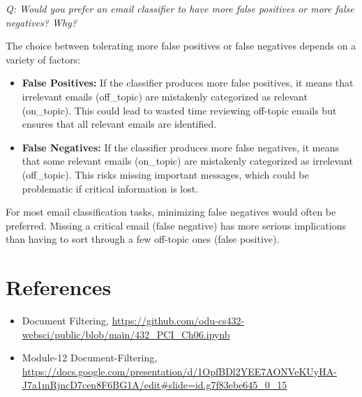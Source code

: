 \documentclass[12pt]{article}
\begin{document}
\emph{Q: Would you prefer an email classifier to have more false positives or more false negatives? Why?}

The choice between tolerating more false positives or false negatives depends on a variety of factors:
\begin{itemize}
    \item \textbf{False Positives:} If the classifier produces more false positives, it means that irrelevant emails (off\_topic) are mistakenly categorized as relevant (on\_topic). This could lead to wasted time reviewing off-topic emails but ensures that all relevant emails are identified.
    \item \textbf{False Negatives:} If the classifier produces more false negatives, it means that some relevant emails (on\_topic) are mistakenly categorized as irrelevant (off\_topic). This risks missing important messages, which could be problematic if critical information is lost.
\end{itemize}

For most email classification tasks, minimizing false negatives would often be preferred. Missing a critical email (false negative) has more serious implications than having to sort through a few off-topic ones (false positive).


\section*{References}

\begin{itemize}
    \item {Document Filtering, \url{https://github.com/odu-cs432-websci/public/blob/main/432_PCI_Ch06.ipynb}}
    \item {Module-12 Document-Filtering, \url{https://docs.google.com/presentation/d/1OpfBDl2YEE7AONVeKUyHA-J7a1mRjncD7cen8F6BG1A/edit#slide=id.g7f83ebe645_0_15}}
\end{itemize}
\end{document}
